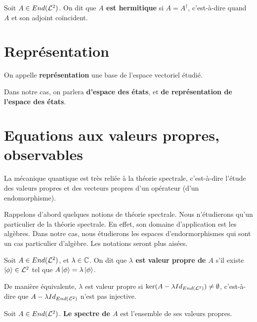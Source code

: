 \begin{definition}
	Soit $A \in End(\mathcal{L}^{2})$. On dit que \textbf{$A$ est
	hermitique} si $A = A^{\dagger}$, c'est-à-dire quand $A$ et son adjoint
	coïncident.
\end{definition}

\section{Représentation}

\begin{definition}
	On appelle \textbf{représentation} une base de l'espace vectoriel étudié.
\end{definition}

Dans notre cas, on parlera \textbf{d'espace des états}, et \textbf{de
représentation de l'espace des états}.

\section{Equations aux valeurs propres, observables}

La mécanique quantique est très reliée à la théorie spectrale, c'est-à-dire
l'étude des valeurs propres et des vecteurs propres d'un opérateur (d'un
endomorphisme).

Rappelons d'abord quelques notions de théorie spectrale. Nous n'étudierons qu'un
particulier de la théorie spectrale. En effet, son domaine d'application est les
algèbres. Dans notre cas, nous étudierons les espaces d'endormorphismes qui sont
un cas particulier d'algèbre. Les notations seront plus aisées.

\begin{definition} 
	Soit $A \in End(\mathcal{L}^{2})$, et $\lambda \in \mathbb{C}$. On dit que
	\textbf{$\lambda$ est valeur propre de $A$} s'il existe $\ket{\phi} \in
	\mathcal{L}^{2}$ tel que $A \ket{\phi} = \lambda \ket{\phi}$.

	De manière équivalente, $\lambda$ est valeur propre si $\ker(A - \lambda
	Id_{End(\mathcal{L}^{2})}) \neq \emptyset$, c'est-à-dire que $A - \lambda
	Id_{End(\mathcal{L}^{2})}$ n'est pas injective.
\end{definition}

\begin{definition} 
	Soit $A \in End(\mathcal{L}^{2})$. \textbf{Le spectre de $A$} est
	l'ensemble de ses valeurs propres.
\end{definition}

